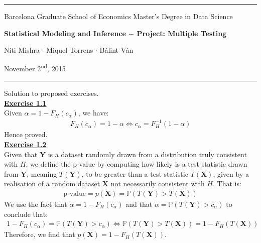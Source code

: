 \documentclass[a4paper, 11pt]{article}
\newcommand{\header}[4]{
	\begin{center}
		\rule{\linewidth}{0.5pt}
		
		{\small{#1}}
      
        \vspace{0.2in}
        
		{\large{#2}}
		
        \vspace{0.2in}
        
		{\small{#3}}
		
		\vspace{0.15in}
		
		{#4}
		
		\vspace{-0.1in}
		\rule{\linewidth}{0.6pt}
	\end{center}
}
\begin{document}
 
\header{\sc Barcelona Graduate School of Economics \hfill Master's Degree in Data Science}{\bf Statistical Modeling and Inference $-$ Project: Multiple Testing}{\sc Niti Mishra $\cdot$ Miquel Torrens $\cdot$ B\'alint V\'an}{November 2\textsuperscript{nd}, 2015}
Solution to proposed exercises.\\
\newline \textbf{\underline{Exercise 1.1}}\\
\newline Given $\alpha = 1 - F_H(c_\alpha)$, we have:
\begin{eqnarray}
F_H(c_\alpha) = 1 - \alpha \Leftrightarrow c_\alpha = F_{H}^{-1}(1- \alpha) \nonumber
\end{eqnarray}
Hence proved.\\
\newline \textbf{\underline{Exercise 1.2}}\\
\newline Given that $\mathbf{Y}$ is a dataset randomly drawn from a distribution truly consistent with $H$, we define the p-value by computing how likely is a test statistic drawn from $\mathbf{Y}$, meaning $T(\mathbf{Y})$, to be greater than a test statistic $T(\mathbf{X})$, given by a realisation of a random dataset $\mathbf{X}$ not necessarily consistent with $H$. That is:
\begin{eqnarray}
\text{p-value} = p(\mathbf{X}) = \mathbb{P}(T(\mathbf{Y}) > T(\mathbf{X})) \nonumber
\end{eqnarray}
We use the fact that $\alpha = 1 - F_H(c_\alpha)$ and that $\alpha = \mathbb{P}(T(\mathbf{Y}) > c_\alpha)$ to conclude that:
\begin{eqnarray}
1 - F_H(c_\alpha) = \mathbb{P}(T(\mathbf{Y}) > c_\alpha) \Leftrightarrow \mathbb{P}(T(\mathbf{Y}) > T(\mathbf{X})) = 1 - F_H(T(\mathbf{X})) \nonumber
\end{eqnarray}
Therefore, we find that $p(\mathbf{X})=1 - F_H(T(\mathbf{X}))$.\\
\end{document}
